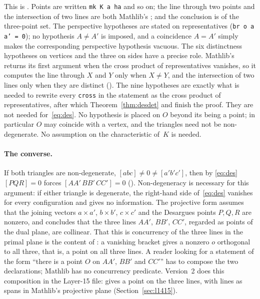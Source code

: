 \documentclass[11pt]{article}
\theoremstyle{definition}
\theoremstyle{remark}
\newcommand{\lean}[1]{\texttt{#1}}
\begin{document}
This is . Points are written \lean{mk K a ha} and so on; the line
through two points and the intersection of two lines are both Mathlib's
; and the conclusion is  of the
three-point set. The perspective hypotheses are stated on representatives
(\lean{br o a a' = 0}); no hypothesis $A\ne A'$ is imposed, and a coincidence $A=A'$ simply makes
the corresponding perspective hypothesis vacuous. The six distinctness hypotheses on vertices and the three on sides have a
precise role. Mathlib's  returns its first argument when the cross
product of representatives vanishes, so it computes the line through $X$ and $Y$ only when
$X\ne Y$, and the intersection of two lines only when they are distinct
(). The nine hypotheses are exactly what is needed to
rewrite every \lean{cross} in the statement as the cross product of representatives, after which
Theorem~\ref{thm:desdet} and  finish the proof. They
are not needed for~\eqref{eq:des}. No hypothesis is placed on $O$ beyond its being a point; in
particular $O$ may coincide with a vertex, and the triangles need not be non-degenerate. No
assumption on the characteristic of~$K$ is needed.

\paragraph{The converse.} If both triangles are non-degenerate, $[abc]\ne0\ne[a'b'c']$, then by
\eqref{eq:des} $[PQR]=0$ forces $[AA'\,BB'\,CC']=0$
(). Non-degeneracy is necessary for this argument: if
either triangle is degenerate, the right-hand side of~\eqref{eq:des} vanishes for every
configuration and gives no information. The projective form
 assumes that the joining vectors $a\times a'$, $b\times b'$,
$c\times c'$ and the Desargues points $P,Q,R$ are nonzero, and concludes that the three lines
$AA'$, $BB'$, $CC'$, regarded as points of the dual plane, are collinear. That this is concurrency
of the three lines in the primal plane is the content of
: a vanishing bracket gives a nonzero $o$
orthogonal to all three, that is, a point on all three lines. A reader looking for a statement of
the form ``there is a point $O$ on $AA'$, $BB'$ and $CC'$'' has to compose the two declarations;
Mathlib has no concurrency predicate. Version~2 does this composition in the Layer-15 file:
 gives a point on the three lines, with lines as spans in
Mathlib's projective plane (Section~\ref{sec:l1415}).
\end{document}
